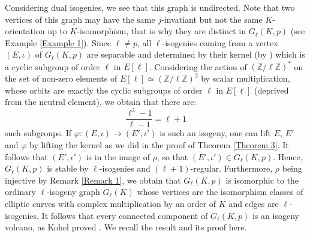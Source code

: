 \documentclass[a4paper,10pt]{report}
\theoremstyle{definition}
\theoremstyle{plain}
\theoremstyle{definition}
\newcommand{\Z}{\mathbb{Z}}
\renewcommand{\(}{\left(}
\renewcommand{\)}{\right)}
\begin{document}
Considering dual isogenies, we see that this graph is undirected. Note that two vertices of this graph may have the same $j$-invatiant but not the same $K$-orientation up to $K$-isomorphism, that is why they are distinct in $G_\ell(K,p)$ (see Example \ref{Example 1}). Since $\ell\neq p$, all $\ell$-isogenies coming from a vertex $(E,\iota)$ of $G_\ell(K,p)$  are separable and determined by their kernel (by \cite[Corollary III.4.11]{Silverman1}) which is a cyclic subgroup of order $\ell$ in $E[\ell]$. Considering the action of $(\Z/\ell\Z)^*$ on the set of non-zero elements of $E[\ell]\simeq(\Z/\ell\Z)^2$ by scalar multiplication, whose orbits are exactly the cyclic subgroups of order $\ell$ in $E[\ell]$ (deprived from the neutral element), we obtain that there are:
\[\frac{\ell^2-1}{\ell-1}=\ell+1\]
such subgroups. If $\varphi:(E,\iota)\longrightarrow (E',\iota')$ is such an isogeny, one can lift $E$, $E'$ and $\varphi$ by lifting the kernel as we did in the proof of Theorem \ref{Theorem 3}.  It follows that $(E',\iota')$ is in the image of $\rho$, so that $(E',\iota')\in G_\ell(K,p)$. Hence, $G_\ell(K,p)$ is stable by $\ell$-isogenies and $(\ell+1)$-regular.  Furthermore, $\rho$ being injective by Remark \ref{Remark 1}, we obtain that $G_\ell(K,p)$ is isomorphic to the ordinary $\ell$-isogeny graph $G_\ell(K)$ whose vertices are the isomorphism classes of elliptic curves with complex multiplication by an order of $K$ and edges are $\ell$-isogenies. It follows that every connected component of $G_\ell(K,p)$ is an isogeny volcano, as Kohel proved \cite[Proposition 23]{Kohel_thesis}. We recall the result and its proof here.
\end{document}
